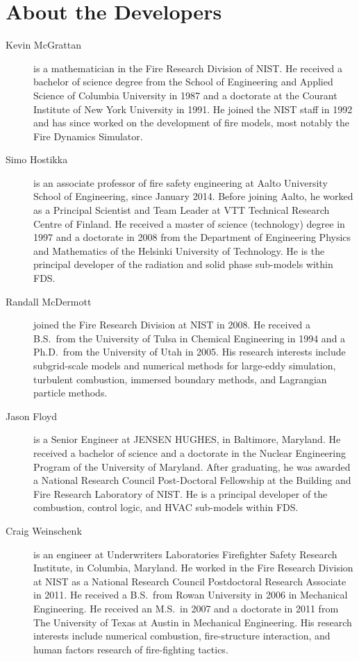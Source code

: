 \chapter{About the Developers}

\begin{description}

\item[Kevin McGrattan] is a mathematician in the Fire Research Division of NIST. He received a bachelor of science degree from the School of Engineering and Applied Science of Columbia University in 1987 and a doctorate at the Courant Institute of New York University in 1991. He joined the NIST staff in 1992 and has since worked on the development of fire models, most notably the Fire Dynamics Simulator.

\item[Simo Hostikka] is an associate professor of fire safety engineering at Aalto University School of Engineering, since January 2014. Before joining Aalto, he worked as a Principal Scientist and Team Leader at VTT Technical Research Centre of Finland. He received a master of science (technology) degree in 1997 and a doctorate in 2008 from the Department of Engineering Physics and Mathematics of the Helsinki University of Technology.  He is the principal developer of the radiation and solid phase sub-models within FDS.

\item[Randall McDermott] joined the Fire Research Division at NIST in 2008. He received a B.S.~from the University of Tulsa in Chemical Engineering in 1994 and a Ph.D.~from the University of Utah in 2005. His research interests include subgrid-scale models and numerical methods for large-eddy simulation, turbulent combustion, immersed boundary methods, and Lagrangian particle methods.

\item[Jason Floyd] is a Senior Engineer at JENSEN HUGHES, in Baltimore, Maryland. He received a bachelor of science and a doctorate in the Nuclear Engineering Program of the University of Maryland. After graduating, he was awarded a National Research Council Post-Doctoral Fellowship at the Building and Fire Research Laboratory of NIST. He is a principal developer of the combustion, control logic, and HVAC sub-models within FDS.

\item[Craig Weinschenk] is an engineer at Underwriters Laboratories Firefighter Safety Research Institute, in Columbia, Maryland. He worked in the Fire Research Division at NIST as a National Research Council Postdoctoral Research Associate in 2011. He received a B.S.~from Rowan University in 2006 in Mechanical Engineering. He received an M.S.~in 2007 and a doctorate in 2011 from The University of Texas at Austin in Mechanical Engineering. His research interests include numerical combustion, fire-structure interaction, and human factors research of fire-fighting tactics.


\end{description}
